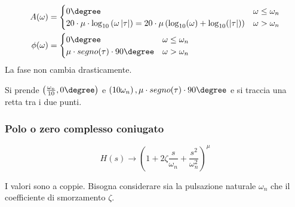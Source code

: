 \documentclass[a4paper]{article}
\begin{document}
\begin{definition}
  \[
    \begin{aligned}
      A(\omega) &= \begin{cases}
        0\degree & \omega \le \omega_n\\
        20 \cdot \mu \cdot \log_{10} \left( \omega \left| \tau \right|  \right) =
        20 \cdot \mu \left( \log_{10}(\omega) + \log_{10}(|\tau|) \right)  & \omega > \omega_n
      \end{cases}\\
        \phi(\omega) &= \begin{cases}
          0\degree & \omega \le \omega_n\\
          \mu \cdot segno(\tau) \cdot 90\degree & \omega > \omega_n
        \end{cases}
        \end{aligned}
      \] 
      La fase non cambia drasticamente.

      Si prende \( \left( \frac{\omega_n}{10}, 0\degree \right)  \) e \( \left( 10 \omega_n \right), 
      \mu \cdot segno(\tau) \cdot 90\degree\) e si traccia una retta tra i due punti.
\end{definition}

\subsubsection{Polo o zero complesso coniugato}
\[
  H(s) \to \left( 1 + 2 \zeta \frac{s}{\omega_n} + \frac{s^2}{\omega_n^2} \right)^{\mu}
\]
\begin{figure}[H]
  \centering
\end{figure}
\noindent
I valori sono a coppie. Bisogna considerare sia la pulsazione naturale \( \omega_n \)
che il coefficiente di smorzamento \( \zeta \).
\end{document}
